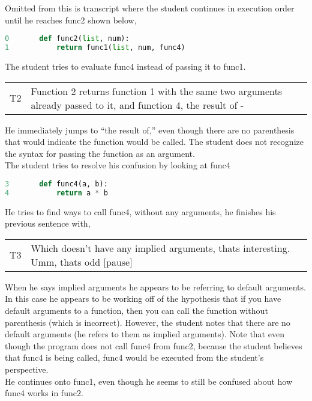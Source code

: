 Omitted from this is transcript where the student continues in execution order until he reaches func2 shown below,

\begin{lstlisting}[language=python]
0		def func2(list, num):
1			return func1(list, num, func4)
\end{lstlisting}

The student tries to evaluate func4 instead of passing it to func1.

\begin{tabular}{lp{13cm}}
T2&Function 2 returns function 1 with the same two arguments already passed to it, and function 4, the result of -\\
\end{tabular}

He immediately jumps to ``the result of,'' even though there are no parenthesis that would indicate the function would be called.
The student does not recognize the syntax for passing the function as an argument. \\

The student tries to resolve his confusion by looking at func4

\begin{lstlisting}[language=python]
3		def func4(a, b):
4			return a * b
\end{lstlisting}

He tries to find ways to call func4, without any arguments, he finishes his previous sentence with,

\begin{tabular}{lp{13cm}}
T3&Which doesn't have any implied arguments, thats interesting. Umm, thats odd [pause]\\
\end{tabular}

When he says implied arguments he appears to be referring to default arguments.
In this case he appears to be working off of the hypothesis that if you have default arguments to a function,
  then you can call the function without parenthesis (which is incorrect).
However, the student notes that there are no default arguments (he refers to them as implied arguments).
Note that even though the program does not call func4 from func2, because the student believes that func4 is being called, func4 would be executed from the student's perspective. \\

He continues onto func1, even though he seems to still be confused about how func4 works in func2.

